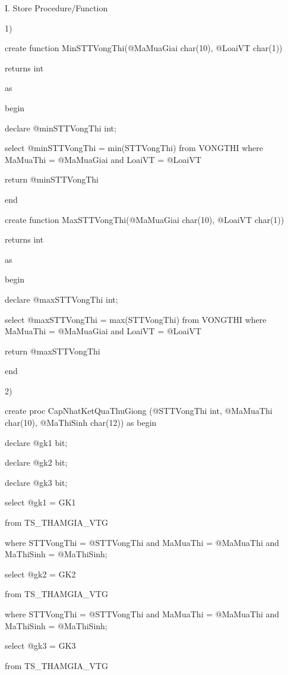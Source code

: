 \documentclass{report}
\begin{document}
\changefontsizes{13pt}
\bigskip
\setlength{\parindent}{0cm}
I. Store Procedure/Function 

1)

\setlength{\parindent}{0.5cm}
create function MinSTTVongThi(@MaMuaGiai char(10), @LoaiVT char(1))

returns int

as 

begin

	\setlength{\parindent}{1.5cm}
	declare @minSTTVongThi int;
	
	select @minSTTVongThi = min(STTVongThi) from VONGTHI where MaMuaThi = @MaMuaGiai and LoaiVT = @LoaiVT
	
	return @minSTTVongThi
	
	\setlength{\parindent}{0.5cm}
end

\bigskip

create function MaxSTTVongThi(@MaMuaGiai char(10), @LoaiVT char(1))

returns int

as 

begin
	
	\setlength{\parindent}{1.5cm}
	
	declare @maxSTTVongThi int;
	
	select @maxSTTVongThi = max(STTVongThi) from VONGTHI where MaMuaThi = @MaMuaGiai and LoaiVT = @LoaiVT
	
	return @maxSTTVongThi
	
	\setlength{\parindent}{0.5cm}
end

\bigskip
\setlength{\parindent}{0cm}
2)

create proc CapNhatKetQuaThuGiong (@STTVongThi int, @MaMuaThi char(10), @MaThiSinh char(12))
as
begin
	
	\setlength{\parindent}{1.5cm}
	declare @gk1 bit;
	
	declare @gk2 bit;
	
	declare @gk3 bit;
	
	select @gk1 = GK1
	
	from TS\_THAMGIA\_VTG
	
	where STTVongThi = @STTVongThi and MaMuaThi = @MaMuaThi and MaThiSinh = @MaThiSinh;
	
	select @gk2 = GK2
	
	from TS\_THAMGIA\_VTG
	
	where STTVongThi = @STTVongThi and MaMuaThi = @MaMuaThi and MaThiSinh = @MaThiSinh;
	
	select @gk3 = GK3
	
	from TS\_THAMGIA\_VTG
	
\end{document}
